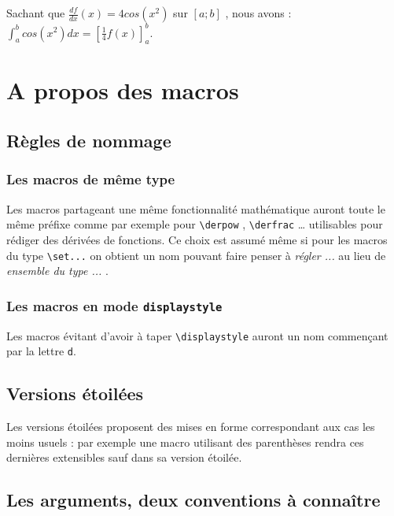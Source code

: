 \documentclass[12pt,a4paper]{article}
\begin{document}
\begin{tcblisting}{}
Sachant que $\displaystyle \frac{df}{dx}(x) = 4 cos(x^2)$ sur $[a ; b]$ , nous avons :
$\displaystyle \int_a^b cos(x^2) dx = \left[ \frac{1}{4} f(x) \right]_a^b$.
\end{tcblisting}



\section{A propos des macros}

\subsection{Règles de nommage}

\subsubsection{Les macros de même \og type \fg}

Les macros partageant une même fonctionnalité mathématique auront toute le même préfixe comme par exemple pour \verb+\derpow+ , \verb+\derfrac+ \dots{} utilisables pour rédiger des dérivées de fonctions.
Ce choix est assumé même si pour les macros du type \verb+\set...+ on obtient un nom pouvant faire penser à \emph{\og régler ... \fg} au lieu de \emph{\og ensemble du type ... \fg}.



\subsubsection{Les macros en mode \texttt{displaystyle}}

Les macros évitant d'avoir à taper \verb+\displaystyle+ auront un nom commençant par la lettre \verb+d+.



\subsection{Versions étoilées}

Les versions étoilées proposent des mises en forme correspondant aux cas les moins usuels : par exemple une macro utilisant des parenthèses rendra ces dernières extensibles sauf dans sa version étoilée.



\subsection{Les arguments, deux conventions à connaître}
\end{document}

